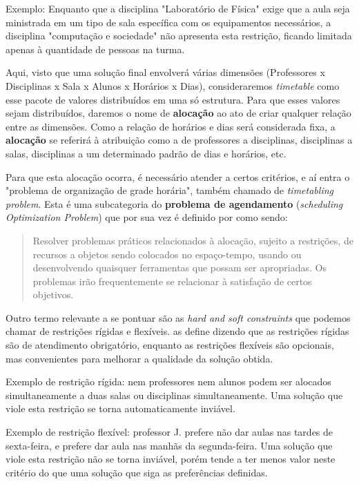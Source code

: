 Exemplo: Enquanto que a disciplina "Laboratório de Física" exige que a aula seja ministrada em um tipo de sala específica com os equipamentos necessários, a disciplina "computação e sociedade" não apresenta esta restrição, ficando limitada apenas à quantidade de pessoas na turma.

Aqui, visto que uma solução final envolverá várias dimensões (Professores x Disciplinas x Sala x Alunos x Horários x Dias), consideraremos \textit{timetable} como esse pacote de valores distribuídos em uma só estrutura. Para que esses valores sejam distribuídos, daremos o nome de \textbf{alocação} ao ato de criar qualquer relação entre as dimensões. Como a relação de horários e dias será considerada fixa, a \textbf{alocação} se referirá à atribuição como a de professores a disciplinas, disciplinas a salas, disciplinas a um determinado padrão de dias e horários, etc.

Para que esta alocação ocorra, é necessário atender a certos critérios, e aí entra o "problema de organização de grade horária", também chamado de \textit{timetabling problem}. Esta é uma subcategoria do \textbf{problema de agendamento} (\textit{scheduling Optimization Problem}) \cite{alencar_visualization_2019} que por sua vez é definido por \cite{goos_scheduling_1996} como sendo:

\begin{quote}\footnotesize
    Resolver problemas práticos relacionados à alocação, sujeito a restrições, de recursos a objetos sendo colocados no espaço-tempo, usando ou desenvolvendo quaisquer ferramentas que possam ser apropriadas. Os problemas irão frequentemente se relacionar à satisfação de certos objetivos.
\end{quote}

Outro termo relevante a se pontuar são as \textit{hard and soft constraints} que podemos chamar de restrições rígidas e flexíveis. \cite{alencar_visualization_2019} as define dizendo que as restrições rígidas são de atendimento obrigatório, enquanto as restrições flexíveis são opcionais, mas convenientes para melhorar a qualidade da solução obtida.

Exemplo de restrição rígida: nem professores nem alunos podem ser alocados simultaneamente a duas salas ou disciplinas simultaneamente. Uma solução que viole esta restrição se torna automaticamente inviável.

Exemplo de restrição flexível: professor J. prefere não dar aulas nas tardes de sexta-feira, e prefere dar aula nas manhãs da segunda-feira. Uma solução que viole esta restrição não se torna inviável, porém tende a ter menos valor neste critério do que uma solução que siga as preferências definidas.

